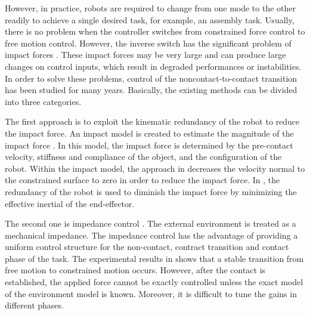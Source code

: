 However, in practice, robots are required to change from one mode to the other readily to achieve a single desired task, for example, an assembly task. Usually, there is no problem when the controller switches from constrained force control to free motion control. However, the inverse switch has the significant problem of impact forces \cite{youcef1989}. These impact forces may be very large and can produce large changes on control inputs, which result in degraded performances or instabilities. In order to solve these problems, control of the noncontact-to-contact transition has been studied for many years. Basically, the existing methods can be divided into three categories.

The first approach is to exploit the kinematic redundancy of the robot to reduce the impact force. An impact model is created to estimate the magnitude of the impact force \cite{walker1990}. In this model, the impact force is determined by the pre-contact velocity, stiffness and compliance of the object, and the configuration of the robot. Within the impact model, the approach in \cite{pagilla2001} decreases the velocity normal to the constrained surface to zero in order to reduce the impact force. In \cite{brufau2005,padois2007}, the redundancy of the robot is used to diminish the impact force by minimizing the effective inertial of the end-effector. 

The second one is impedance control \cite{hogan1985}. The external environment is treated as a mechanical impedance. The impedance control has the advantage of providing a uniform control structure for the non-contact, contract transition and contact phase of the task. The experimental results in \cite{kazerooni1990} shows that a stable transition from free motion to constrained motion occurs. However, after the contact is established, the applied force cannot be exactly controlled unless the exact model of the environment model is known. Moreover, it is difficult to tune the gains in different phases.

